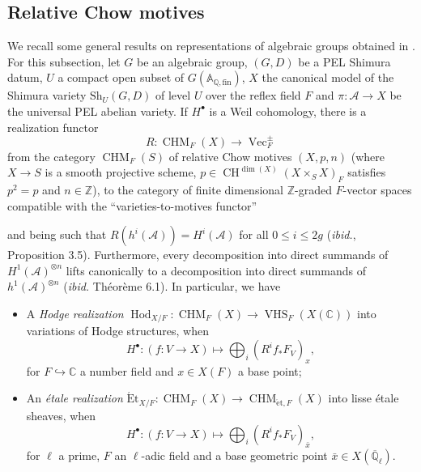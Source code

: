 \documentclass[a4paper]{amsart}
\numberwithin{equation}{section}
\theoremstyle{definition}
\newcommand{\Q}{\mathbb{Q}}
\newcommand{\Z}{\mathbb{Z}}
\newcommand{\C}{\mathbb{C}}
\newcommand{\A}{\mathbb{A}}
\DeclareMathOperator{\et}{\text{\'et}}
\DeclareMathOperator{\CHM}{CHM}
\DeclareMathOperator{\VHS}{VHS}
\newcommand{\Et}{\mathrm{\acute{E}t}}
\renewcommand{\et}{\mathrm{\acute{e}t}}
\begin{document}
\subsection{Relative Chow motives}
We recall some general results on representations of algebraic groups obtained in \cite{Ancona}.
For this subsection, let ${G}$ be an algebraic group, $({G},D)$ be a PEL Shimura datum, $U$ a compact open subset of ${G}(\A_{\Q,\mathrm{fin}})$, $X$ the canonical model of the Shimura variety $\mathrm{Sh}_U({G},D)$ of level $U$ over the reflex field $F$ and $\pi\colon\mathcal{A}\to X$ be the universal PEL abelian variety. If $H^\bullet$ is a Weil cohomology, there is a realization functor \[R\colon\CHM_F(X)\to\operatorname{Vec}_F^\pm\] from the category $\operatorname{CHM}_F(S)$ of relative Chow motives $(X,p,n)$ (where $X\to S$ is a smooth projective scheme, $p\in\operatorname{CH}^{\dim(X)}(X\times_S X)_F$ satisfies $p^2=p$ and $n\in\Z$), to the category of finite dimensional $\Z$-graded $F$-vector spaces compatible with the ``varieties-to-motives functor''
\begin{center}
\end{center} 
and being such that $R(h^i(\mathcal{A}))=H^i(\mathcal{A})$ for all $0\le i\le 2g$ (\textit{ibid.}, Proposition 3.5). Furthermore, every decomposition into direct summands of $H^1(\mathcal{A})^{\otimes n}$ lifts canonically to a decomposition into direct summands of $h^1(\mathcal{A})^{\otimes n}$ (\textit{ibid.} Théorème 6.1). In particular, we have
\begin{itemize}
\item A \textit{Hodge realization} $\operatorname{Hod}_{X/F}\colon \CHM_F(X)\to\VHS_F(X(\C))$ into variations of Hodge structures, when \[H^\bullet\colon (f\colon V\to X)\mapsto \bigoplus_i (R^if_*F_V)_x,\] for $F\hookrightarrow\C$ a number field and $x\in X(F)$ a base point;

\item An \textit{étale realization} $\Et_{X/F}\colon\CHM_F(X)\to\CHM_{\et,F}(X)$ into lisse étale sheaves, when \[H^\bullet\colon (f\colon V\to X)\mapsto \bigoplus_i \left(R^if_*F_V\right)_{\bar{x}},\] for $\ell$ a prime, $F$ an $\ell$-adic field and a base geometric point $\bar{x}\in X(\overline{\Q}_\ell)$.
\end{itemize}
\end{document}
